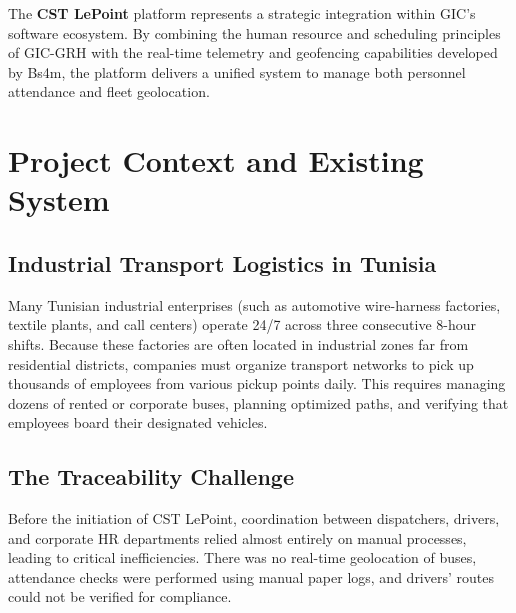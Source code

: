The \textbf{CST LePoint} platform represents a strategic integration within GIC's software ecosystem. By combining the human resource and scheduling principles of GIC-GRH with the real-time telemetry and geofencing capabilities developed by Bs4m, the platform delivers a unified system to manage both personnel attendance and fleet geolocation.

\section{Project Context and Existing System}

\subsection{Industrial Transport Logistics in Tunisia}
Many Tunisian industrial enterprises (such as automotive wire-harness factories, textile plants, and call centers) operate 24/7 across three consecutive 8-hour shifts. Because these factories are often located in industrial zones far from residential districts, companies must organize transport networks to pick up thousands of employees from various pickup points daily. This requires managing dozens of rented or corporate buses, planning optimized paths, and verifying that employees board their designated vehicles.

\subsection{The Traceability Challenge}
Before the initiation of CST LePoint, coordination between dispatchers, drivers, and corporate HR departments relied almost entirely on manual processes, leading to critical inefficiencies. There was no real-time geolocation of buses, attendance checks were performed using manual paper logs, and drivers' routes could not be verified for compliance.

